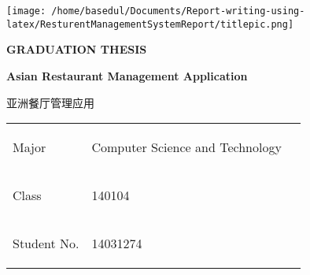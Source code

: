 \documentclass[12pt,a4paper]{article}
\newcommand{\zh}[1]{\begin{CJK}{UTF8}{gbsn}#1\end{CJK}}
\begin{document}
	\begin{titlepage}
	\begin{center}
	\centering
	\noindent\begin{minipage}{0.3\textwidth}%
\texttt{[image: /home/basedul/Documents/Report-writing-using-latex/ResturentManagementSystemReport/titlepic.png]}
\end{minipage}
\hfill
\begin{minipage}{0.6\textwidth}
{\fontsize{24}{10}\selectfont \textbf{GRADUATION THESIS}
}

\end{minipage}

\par\vspace{0cm}
	{\fontsize{22}{10}\selectfont \begin{center}
	\textbf{Asian Restaurant Management Application}
	\end{center}}
	{\fontsize{20}{10}\selectfont \begin{center}
	\zh{亚洲餐厅管理应用}
	\end{center}}
	\vspace{1cm}
	
	\begin{table}[ht]
	\center
	\begin{tabular}{M{4cm}M{8cm}N}
	
	{\fontsize{16}{10}\selectfont \begin{flushleft}
	Major
	\end{flushleft}} & {\fontsize{16}{10}\selectfont \begin{flushleft}
	Computer Science and Technology
	\end{flushleft}}&\\[0.1pt]
	
	{\fontsize{16}{10}\selectfont \begin{flushleft}
	Class
	\end{flushleft}} & {\fontsize{16}{10}\selectfont \begin{flushleft}
	140104
	\end{flushleft}}&\\[0.1pt]
	
	{\fontsize{16}{10}\selectfont \begin{flushleft}
	Student No.
	\end{flushleft}} & {\fontsize{16}{10}\selectfont \begin{flushleft}
	14031274
	\end{flushleft}}&\\[0.1pt]
	

\end{tabular}
\end{table}
\end{center}
\end{titlepage}
\end{document}
